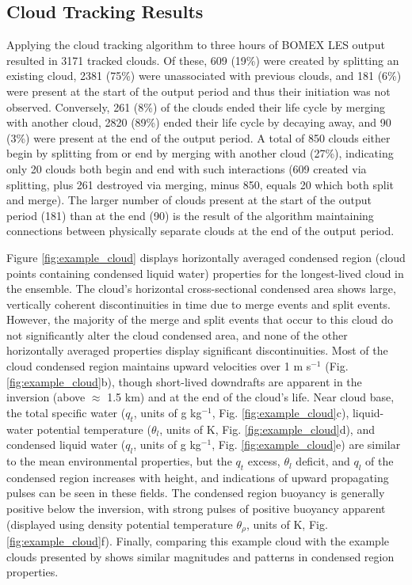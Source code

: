 \documentclass[acp]{copernicus}
\begin{document}
\subsection{Cloud Tracking Results}

Applying the cloud tracking algorithm to three hours of BOMEX LES output 
resulted in 3171 tracked clouds.  Of these, 609 (19\%) were created by 
splitting an existing cloud, 2381 (75\%) were unassociated with previous 
clouds, and 181 (6\%) were present at the start of the output period and thus 
their initiation was not observed.  Conversely, 261 (8\%) of the clouds ended 
their life cycle by merging with another cloud, 2820 (89\%) ended their 
life cycle by decaying away, and 90 (3\%) were present at the end of the output 
period.  A total of 850 clouds either begin by splitting from or end by merging 
with another cloud (27\%), indicating only 20 clouds both begin and end with 
such interactions (609 created via splitting, plus 261 destroyed via merging, 
minus 850, equals 20 which both split and merge).  The larger number of clouds 
present at the start of the output period (181) than at the end (90) is the 
result of the algorithm maintaining connections between physically separate 
clouds at the end of the output period.

Figure \ref{fig:example_cloud} displays horizontally averaged condensed region 
(cloud points containing condensed liquid water) properties for the 
longest-lived cloud in the ensemble.  The cloud's horizontal cross-sectional 
condensed area shows large, vertically coherent discontinuities in time due to 
merge events and split events.  However, the majority of the merge and split 
events that occur to this cloud do not significantly alter the cloud condensed 
area, and none of the other horizontally averaged properties display 
significant discontinuities.  Most of the cloud condensed region maintains 
upward velocities over 1 m s$^{-1}$ (Fig. \ref{fig:example_cloud}b), though 
short-lived downdrafts are apparent in the inversion (above $\approx$ 1.5 km) 
and at the end of the cloud's life.  Near cloud base, the total specific water 
($q_t$, units of g kg$^{-1}$, Fig. \ref{fig:example_cloud}c), liquid-water 
potential temperature ($\theta_l$, units of K, Fig. 
\ref{fig:example_cloud}d), and condensed liquid water ($q_l$, units of 
g kg$^{-1}$, Fig. \ref{fig:example_cloud}e) are similar to the mean 
environmental properties, but the $q_t$ excess, $\theta_l$ deficit, and 
$q_l$ of the condensed region increases with height, and indications of upward 
propagating pulses can be seen in these fields.  The condensed region buoyancy 
is generally positive below the inversion, with strong pulses of positive 
buoyancy apparent (displayed using density potential temperature 
$\theta_\rho$, units of K, Fig. \ref{fig:example_cloud}f).  Finally, 
comparing this example cloud with the example clouds presented by 
\citet[][figs. 4 and 5]{Heus2009} shows similar magnitudes and patterns in 
condensed region properties.
\end{document}
